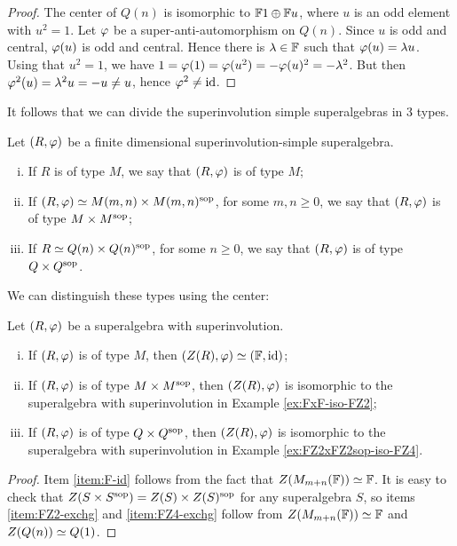 \begin{proof}
	The center of $Q(n)$ is isomorphic to $\mathbb{F}1 \oplus \mathbb{F} u$, where $u$ is an odd element with $u^2 = 1$.
	Let $\varphi$ be a super-anti-automorphism on $Q(n)$.
	Since $u$ is odd and central, $\varphi(u)$ is odd and central.
	Hence there is $\lambda \in \mathbb{F}$ such that $\varphi(u) = \lambda u$.
	Using that $u^2 = 1$, we have $1 = \varphi(1) = \varphi(u^2) = - \varphi(u)^2 = - \lambda^2$.
	But then $\varphi^2 (u) = \lambda^2 u = -u \neq u$, hence $\varphi^2 \neq \operatorname{id}$.
\end{proof}

It follows that we can divide the superinvolution simple superalgebras in 3 types.

\begin{defi}
    Let $(R, \varphi)$ be a finite dimensional superinvolution-simple superalgebra. 
    \begin{enumerate}[(i)]
        \item If $R$ is of type $M$, we say that $(R, \varphi)$ is of type $M$;
        \item If $(R, \varphi) \simeq M(m,n) \times M(m,n)^{\mathrm{sop}}$, for some $m,n \geq 0$, we say that $(R, \varphi)$ is of type $M\times M^{\mathrm{sop}}$;
        \item If $R \simeq Q(n) \times Q(n)^{\mathrm{sop}}$, for some $n \geq 0$, we say that $(R, \varphi)$ is of type $Q \times Q^{\mathrm{sop}}$.
    \end{enumerate}
\end{defi}

We can distinguish these types using the center:

\begin{prop}\label{prop:types-of-SA-via-center}
	Let $(R, \varphi)$ be a superalgebra with superinvolution.
	\begin{enumerate}[(i)]
		\item If $(R, \varphi)$ is of type $M$, then $(Z(R), \varphi) \simeq (\mathbb{F}, \operatorname{id})$;\label{item:F-id}
		\item If $(R, \varphi)$ is of type $M\times M^{\mathrm{sop}}$, then $(Z(R), \varphi)$ is isomorphic to the superalgebra with superinvolution in Example \ref{ex:FxF-iso-FZ2};\label{item:FZ2-exchg}
		\item If $(R, \varphi)$ is of type $Q\times Q^{\mathrm{sop}}$, then $(Z(R), \varphi)$ is isomorphic to the superalgebra with superinvolution in Example \ref{ex:FZ2xFZ2sop-iso-FZ4}.\label{item:FZ4-exchg}
	\end{enumerate}
\end{prop}

\begin{proof}
	Item \eqref{item:F-id} follows from the fact that $Z(M_{m+n}(\mathbb{F})) \simeq \mathbb{F}$.
	It is easy to check that $Z(S\times S^{\mathrm{sop}}) = Z(S) \times Z(S)^{\mathrm{sop}}$ for any superalgebra $S$, so items \eqref{item:FZ2-exchg} and \eqref{item:FZ4-exchg} follow from $Z(M_{m+n}(\mathbb{F})) \simeq \mathbb{F}$ and $Z(Q(n)) \simeq Q(1)$.
\end{proof}

